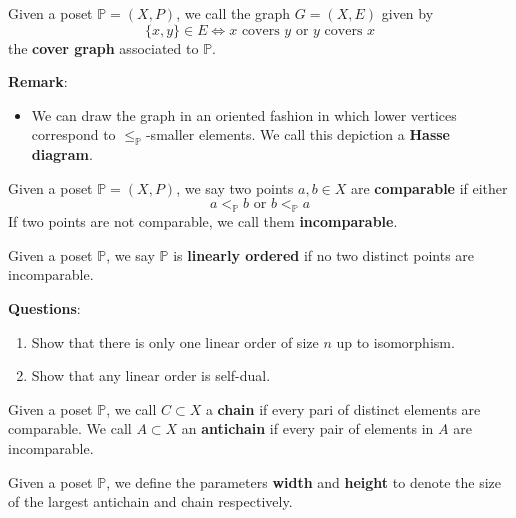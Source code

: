 \begin{definition}
    Given a poset $\mathbb{P}=(X,P)$, we call the graph $G=(X,E)$ given by $$\{x,y\}\in E \Longleftrightarrow x \text{ covers }y \text{ or }y \text{ covers }x$$
    the \textbf{cover graph} associated to $\mathbb{P}$.
\end{definition}
\textbf{Remark}:
\begin{itemize}
    \item We can draw the graph in an oriented fashion in which lower vertices correspond to $\leq_{\mathbb{P}}$-smaller elements. We call this depiction a \textbf{Hasse diagram}.
\end{itemize}


\begin{definition}
    Given a poset $\mathbb{P}=(X,P)$, we say two points $a,b \in X$ are \textbf{comparable} if either $$a <_{\mathbb{P}} b \text{ or } b<_{\mathbb{P}} a$$
    If two points are not comparable, we call them \textbf{incomparable}.
\end{definition}


\begin{definition}
    Given a poset $\mathbb{P}$, we say $\mathbb{P}$ is \textbf{linearly ordered} if no two distinct points are incomparable.
\end{definition}
\textbf{Questions}:
\begin{enumerate}
    \item Show that there is only one linear order of size $n$ up to isomorphism.
    \item Show that any linear order is self-dual.
\end{enumerate}


\begin{definition}
    Given a poset $\mathbb{P}$, we call $C \subset X$ a \textbf{chain} if every pari of distinct elements are comparable. 
    We call $A \subset X$ an \textbf{antichain} if every pair of elements in $A$ are incomparable.
\end{definition}


\begin{definition}
    Given a poset $\mathbb{P}$, we define the parameters \textbf{width} and \textbf{height} to denote the size of the largest antichain and chain respectively.
\end{definition}


